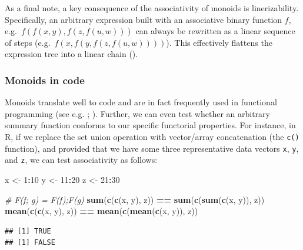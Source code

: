 \documentclass[
]{book}
\newenvironment{Shaded}{\begin{snugshade}}{\end{snugshade}}
\newcommand{\CommentTok}[1]{\textcolor[rgb]{0.56,0.35,0.01}{\textit{#1}}}
\newcommand{\DecValTok}[1]{\textcolor[rgb]{0.00,0.00,0.81}{#1}}
\newcommand{\FunctionTok}[1]{\textcolor[rgb]{0.13,0.29,0.53}{\textbf{#1}}}
\newcommand{\NormalTok}[1]{#1}
\newcommand{\OtherTok}[1]{\textcolor[rgb]{0.56,0.35,0.01}{#1}}
\newcommand{\SpecialCharTok}[1]{\textcolor[rgb]{0.81,0.36,0.00}{\textbf{#1}}}
\theoremstyle{definition}
\theoremstyle{definition}
\theoremstyle{definition}
\theoremstyle{definition}
\theoremstyle{remark}
\begin{document}
As a final note, a key consequence of the associativity of monoids is linerizability. Specifically, an arbitrary expression built with an associative binary function \(f\), e.g.~\(f(f(x, y), f(z, f(u, w)))\) can always be rewritten as a linear sequence of steps (e.g.~\(f(x, f(y, f(z, f(u, w))))\)). This effectively flattens the expression tree into a linear chain ().

\subsubsection{Monoids in code}\label{monoids-in-code}

Monoids translate well to code and are in fact frequently used in functional programming (see e.g. ; ). Further, we can even test whether an arbitrary summary function conforms to our specific functorial properties. For instance, in R, if we replace the set union operation with vector/array concatenation (the \texttt{c()} function), and provided that we have some three representative data vectors \texttt{x}, \texttt{y}, and \texttt{z}, we can test associativity as follows:

\begin{Shaded}
\begin{Highlighting}[]
\NormalTok{x }\OtherTok{\textless{}{-}} \DecValTok{1}\SpecialCharTok{:}\DecValTok{10}
\NormalTok{y }\OtherTok{\textless{}{-}} \DecValTok{11}\SpecialCharTok{:}\DecValTok{20}
\NormalTok{z }\OtherTok{\textless{}{-}} \DecValTok{21}\SpecialCharTok{:}\DecValTok{30}

\CommentTok{\#     F(f; g)       =     F(f);F(g)}
\FunctionTok{sum}\NormalTok{(}\FunctionTok{c}\NormalTok{(}\FunctionTok{c}\NormalTok{(x, y), z)) }\SpecialCharTok{==} \FunctionTok{sum}\NormalTok{(}\FunctionTok{c}\NormalTok{(}\FunctionTok{sum}\NormalTok{(}\FunctionTok{c}\NormalTok{(x, y)), z))}
\FunctionTok{mean}\NormalTok{(}\FunctionTok{c}\NormalTok{(}\FunctionTok{c}\NormalTok{(x, y), z)) }\SpecialCharTok{==} \FunctionTok{mean}\NormalTok{(}\FunctionTok{c}\NormalTok{(}\FunctionTok{mean}\NormalTok{(}\FunctionTok{c}\NormalTok{(x, y)), z))}
\end{Highlighting}
\end{Shaded}

\begin{verbatim}
## [1] TRUE
## [1] FALSE
\end{verbatim}
\end{document}

